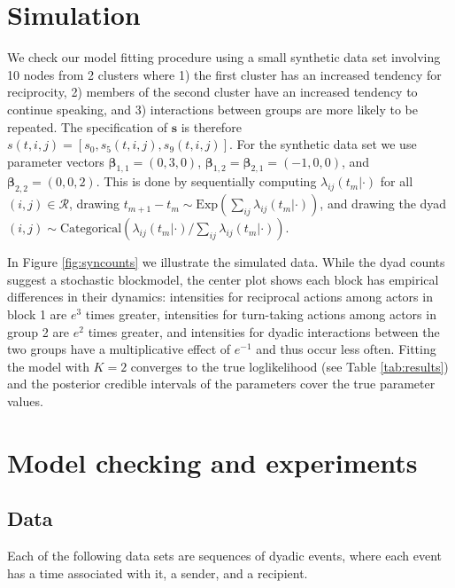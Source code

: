 \documentclass[11pt]{article}
\begin{document}
\section{Simulation}

We check our model fitting procedure using a small synthetic data set involving 10 nodes from 2 clusters where 1) the first cluster has an increased tendency for reciprocity, 2) members of the second cluster have an increased tendency to continue speaking, and 3) interactions between groups are more likely to be repeated.  The specification of $\textbf{s}$ is therefore $s(t,i,j) = [s_0, s_{5}(t,i,j), s_{9}(t,i,j)]$.  For the synthetic data set we use parameter vectors $\boldsymbol{\beta}_{1,1} = (0,3,0)$,  $\boldsymbol{\beta}_{1,2} = \boldsymbol{\beta}_{2,1} = (-1,0,0)$, and $\boldsymbol{\beta}_{2,2} = (0,0,2)$.  This is done by sequentially computing $\lambda_{ij}(t_m|\cdot)$ for all $(i,j) \in \mathcal{R}$, drawing $t_{m+1}-t_m \sim \mbox{Exp}(\sum_{ij} \lambda_{ij}(t_m|\cdot))$, and drawing the dyad $(i,j) \sim \mbox{Categorical}(\lambda_{ij}(t_m|\cdot) / \sum_{ij}\lambda_{ij}(t_m|\cdot))$.  

In Figure \ref{fig:syncounts} we illustrate the simulated data.  While the dyad counts suggest a stochastic blockmodel, the center plot shows each block has empirical differences in their dynamics: intensities for reciprocal actions among actors in block 1 are $e^3$ times greater, intensities for turn-taking actions among actors in group 2 are $e^2$ times greater, and intensities for dyadic interactions between the two groups have a multiplicative effect of $e^{-1}$ and thus occur less often.  Fitting the model with $K=2$ converges to the true loglikelihood (see Table \ref{tab:results}) and the posterior credible intervals of the parameters cover the true parameter values.

\section{Model checking and experiments}

\small{

}

\subsection*{Data}

Each of the following data sets are sequences of dyadic events, where each event has a time associated with it, a sender, and a recipient.
\end{document}
